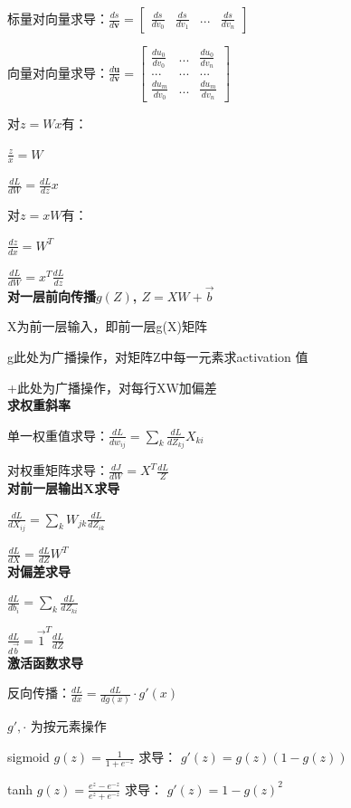\documentclass[UTF8]{ctexart}
\begin{document}
  标量对向量求导：$\frac{ds}{d\textbf{v}} = \begin{bmatrix}
    \frac{ds}{dv_0} & \frac{ds}{dv_1} & ... & \frac{ds}{dv_n}
    \end{bmatrix}$

  向量对向量求导：$\frac{d\textbf{u}}{d\textbf{v}} = \begin{bmatrix}
    \frac{du_0}{dv_0} & ... & \frac{du_0}{dv_n} \\
    ... & ... & ... \\
    \frac{du_m}{dv_0} & ... & \frac{du_m}{dv_n}
    \end{bmatrix}$
  
  对$z = Wx$有：
  
  \quad $\frac{z}{x} = W$
  
  \quad $\frac{dL}{dW} = \frac{dL}{dz}x$

  对$z = xW$有：
  
  \quad $\frac{dz}{dx} = W^T$

  \quad $\frac{dL}{dW} = x^T\frac{dL}{dz}$\\
\textbf{对一层前向传播$g(Z)$, $Z = XW + \vec{b}$}

  X为前一层输入，即前一层g(X)矩阵
  
  g此处为广播操作，对矩阵Z中每一元素求activation 值
  
  +此处为广播操作，对每行XW加偏差\\
\textbf{求权重斜率}
  
  单一权重值求导：$\frac{dL}{dw_{ij}} = \sum_k \frac{dL}{dZ_{kj}} X_{ki}$

  对权重矩阵求导：$\frac{dJ}{dW} = X^T\frac{dL}{Z}$\\
\textbf{对前一层输出X求导}

  $\frac{dL}{dX_{ij}} = \sum_k W_{jk}\frac{dL}{dZ_{ik}}$

  $\frac{dL}{dX} = \frac{dL}{dZ}W^T$\\
\textbf{对偏差求导}

  $\frac{dL}{db_i} = \sum_k \frac{dL}{dZ_{ki}}$

  $\frac{dL}{d\vec{b}} = \vec{1}^T\frac{dL}{dZ}$\\
\textbf{激活函数求导}

  反向传播：$\frac{dL}{dx} = \frac{dL}{dg(x)} \cdot g'(x)$
  
  \quad $g', \cdot$ 为按元素操作

  sigmoid $g(z) = \frac{1}{1 + e^{-z}}$ 求导： $g'(z) = g(z)(1 - g(z))$

  tanh $g(z) = \frac{e^z - e^{-z}}{e^z + e^{-z}}$ 求导： $g'(z) = 1 - g(z)^2$
\end{document}

